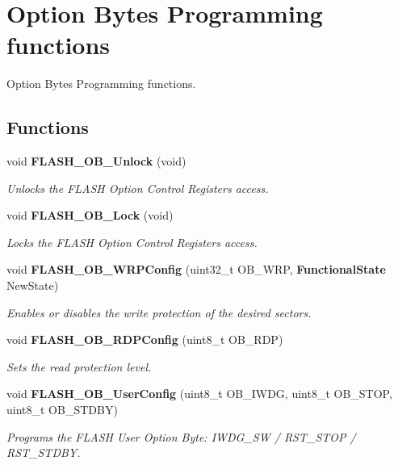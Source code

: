 \section{Option Bytes Programming functions}
\label{group__FLASH__Group3}


Option Bytes Programming functions.  


\subsection*{Functions}
\begin{DoxyCompactItemize}
\item 
void \textbf{ F\+L\+A\+S\+H\+\_\+\+O\+B\+\_\+\+Unlock} (void)
\begin{DoxyCompactList}\small\item\em Unlocks the F\+L\+A\+SH Option Control Registers access. \end{DoxyCompactList}\item 
void \textbf{ F\+L\+A\+S\+H\+\_\+\+O\+B\+\_\+\+Lock} (void)
\begin{DoxyCompactList}\small\item\em Locks the F\+L\+A\+SH Option Control Registers access. \end{DoxyCompactList}\item 
void \textbf{ F\+L\+A\+S\+H\+\_\+\+O\+B\+\_\+\+W\+R\+P\+Config} (uint32\+\_\+t O\+B\+\_\+\+W\+RP, \textbf{ Functional\+State} New\+State)
\begin{DoxyCompactList}\small\item\em Enables or disables the write protection of the desired sectors. \end{DoxyCompactList}\item 
void \textbf{ F\+L\+A\+S\+H\+\_\+\+O\+B\+\_\+\+R\+D\+P\+Config} (uint8\+\_\+t O\+B\+\_\+\+R\+DP)
\begin{DoxyCompactList}\small\item\em Sets the read protection level. \end{DoxyCompactList}\item 
void \textbf{ F\+L\+A\+S\+H\+\_\+\+O\+B\+\_\+\+User\+Config} (uint8\+\_\+t O\+B\+\_\+\+I\+W\+DG, uint8\+\_\+t O\+B\+\_\+\+S\+T\+OP, uint8\+\_\+t O\+B\+\_\+\+S\+T\+D\+BY)
\begin{DoxyCompactList}\small\item\em Programs the F\+L\+A\+SH User Option Byte\+: I\+W\+D\+G\+\_\+\+SW / R\+S\+T\+\_\+\+S\+T\+OP / R\+S\+T\+\_\+\+S\+T\+D\+BY. \end{DoxyCompactList}\item 

\end{DoxyCompactItemize}
